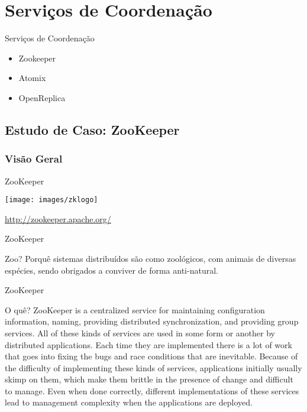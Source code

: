 \section{Serviços de Coordenação}

\begin{frame}{Serviços de Coordenação}
\begin{itemize}
	\item Zookeeper
	\item Atomix
	\item OpenReplica
\end{itemize}
\end{frame}

\subsection{Estudo de Caso: ZooKeeper}

\subsubsection{Visão Geral}
\begin{frame}{ZooKeeper}
\begin{center}
\texttt{[image: images/zklogo]}
\end{center}
\url{http://zookeeper.apache.org/}
\end{frame}


\begin{frame}{ZooKeeper}
\begin{block}{Zoo?}
Porquê sistemas distribuídos são como zoológicos, com animais de diversas espécies, sendo obrigados a conviver de forma anti-natural.
\end{block}
\end{frame}

\begin{frame}{ZooKeeper}
\begin{block}{O quê?}
ZooKeeper is a \alert{centralized} service for maintaining \alert{configuration} information, \alert{naming}, providing distributed \alert{synchronization}, and providing \alert{group services}. All of these kinds of services are used in some form or another by \alert{distributed applications}. Each time they are implemented there is a lot of work that goes into fixing the bugs and race conditions that are inevitable. Because of the difficulty of implementing these kinds of services, applications initially usually skimp on them, which make them brittle in the presence of change and difficult to manage. Even when done correctly, different implementations of these services lead to management \alert{complexity} when the applications are deployed.
\end{block}
\end{frame}


